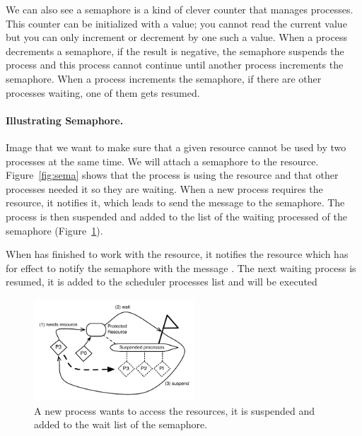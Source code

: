 \documentclass[a4paper,10pt,twoside]{book}
\begin{document}
We can also see a semaphore is a kind of clever counter that manages processes. 
This counter can be initialized with a value;  you cannot read the current value but you can only increment or decrement by one such a value. When a process decrements a semaphore, if the result is negative, the 
semaphore suspends the process and this process cannot continue until another process increments 
the semaphore. When a process increments the semaphore, if there are other processes waiting, one of them gets resumed.



\paragraph{Illustrating Semaphore.}
Image that we want to make sure that a given resource cannot be used by two processes at the same time.
We will attach a semaphore to the resource. Figure~\ref{fig:sema} shows that the process  is using the resource and that other processes needed it so they are waiting. When a new process  requires the resource, it notifies it, which leads to send the message  to the semaphore. The process is then suspended and added to the list of the waiting processed of the semaphore (Figure~\ref{fig:SemaphoreSendingWait}). 


When  has finished to work with the resource, it notifies the resource which has for effect to notify the semaphore with the message . The next waiting process is resumed, it is added to the scheduler processes list and will be executed 


\begin{figure}
\begin{center}
\includegraphics[width=6cm]{SemaphoreSendingWait2}
\caption{A new process wants to access the resources, it is suspended and added to the wait list of the semaphore. \label{fig:SemaphoreSendingWait}}
\end{center}
\end{figure}
\end{document}
